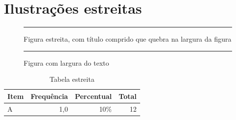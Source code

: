 \documentclass{abntex2-ufv}
\begin{document}
\textual
\chapter{Ilustrações estreitas}
\begin{figure}[htbp]
\begin{ilustracao}{\caption{Figura estreita, com título comprido que quebra na largura da figura}\label{fig:estreita}}{\elaboracaopropria}
  \rule{4cm}{2cm}
\end{ilustracao}
\end{figure}

\begin{figure}[htbp]
\begin{ilustracao}[\linewidth]{\caption{Figura com largura do texto}\label{fig:larga}}{\elaboracaopropria}
  \centering\rule{4cm}{2cm}
\end{ilustracao}
\end{figure}

\begin{table}[htbp]
\begin{tabela}{\caption{Tabela estreita}\label{tab:estreita}}{}
  \begin{tabular}{lrrr}
    \toprule
    Item & Frequência & Percentual & Total \\
    \midrule
    A & 1,0 & 10\% & 12 \\
    \bottomrule
  \end{tabular}
\end{tabela}
\end{table}
\end{document}
